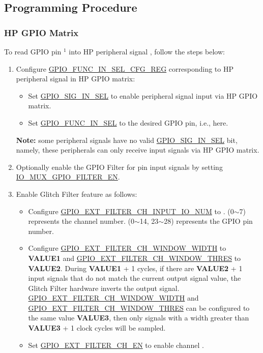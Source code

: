 \documentclass[main\_\_EN.tex]{subfiles}
\begin{document}
\subsection{Programming Procedure}
\label{sec:functional-description}
\subsubsection{HP GPIO Matrix}
\label{sec:prgramming-procedure-for-hp}
To read GPIO pin \hyperref[input-note-1]{$^1$} into HP peripheral signal , follow the steps below:

\begin{enumerate}
    \item Configure \hyperref[regdesc:GPIOFUNCMINSELCFGREG]{GPIO\_FUNC\_IN\_SEL\_CFG\_REG} corresponding to HP peripheral signal  in HP GPIO matrix:
    \begin{itemize}
        \item Set \hyperref[fielddesc:GPIOSIGNINSEL]{GPIO\_SIG\_IN\_SEL} to enable peripheral signal input via HP GPIO matrix.
        \item Set \hyperref[fielddesc:GPIOFUNCMINSEL]{GPIO\_FUNC\_IN\_SEL} to the desired GPIO pin, i.e.,  here.
    \end{itemize}
    {\bfseries Note:} some peripheral signals have no valid \hyperref[fielddesc:GPIOSIGNINSEL]{GPIO\_SIG\_IN\_SEL} bit, namely, these peripherals can only receive input signals via HP GPIO matrix.
    \item \label{step:2} Optionally enable the GPIO Filter for pin input signals by setting \hyperref[fielddesc:IOMUXGPIONFILTEREN] {IO\_MUX\_GPIO\_FILTER\_EN}.
\item \label{step:3}  Enable Glitch Filter feature as follows:
\begin{itemize}
    \item Configure \hyperref[fielddesc:GPIOEXTFILTERCH0INPUTIONUM]{GPIO\_EXT\_FILTER\_CH\_INPUT\_IO\_NUM} to .  (0$\sim$7) represents the channel number.  (0$\sim$14, 23$\sim$28) represents the GPIO pin number.
    \item Configure \hyperref[fielddesc:GPIOEXTFILTERCH0WINDOWWIDTH]{GPIO\_EXT\_FILTER\_CH\_WINDOW\_WIDTH} to \textbf{VALUE1} and \hyperref[fielddesc:GPIOEXTFILTERCH0WINDOWTHRES]{GPIO\_EXT\_FILTER\_CH\_WINDOW\_THRES} to \textbf{VALUE2}. During \textbf{VALUE1} + 1 cycles, if there are \textbf{VALUE2} + 1 input signals that do not match the current output signal value, the Glitch Filter hardware inverts the output signal. \hyperref[fielddesc:GPIOEXTFILTERCH0WINDOWWIDTH]{GPIO\_EXT\_FILTER\_CH\_WINDOW\_WIDTH} and  \hyperref[fielddesc:GPIOEXTFILTERCH0WINDOWTHRES]{GPIO\_EXT\_FILTER\_CH\_WINDOW\_THRES} can be configured to the same value \textbf{VALUE3}, then only signals with a width greater than \textbf{VALUE3} + 1 clock cycles will be sampled.
    \item Set  \hyperref[fielddesc:GPIOEXTFILTERCH0EN]{GPIO\_EXT\_FILTER\_CH\_EN} to enable channel .
\end{itemize}


\end{enumerate}
\end{document}
